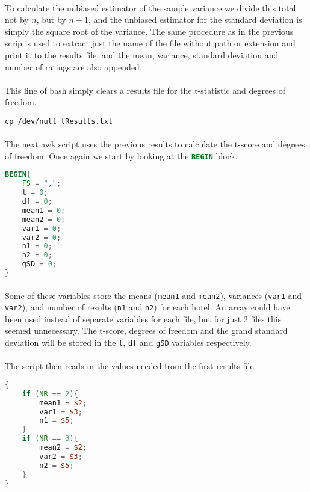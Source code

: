 \documentclass[10pt]{article}
\begin{document}
\paragraph{}
To calculate the unbiased estimator of the sample variance we divide this total not by $n$, but by $n-1$, and the unbiased estimator for the standard deviation is simply the square root of the variance. The same procedure as in the previous scrip is used to extract just the name of the file without path or extension and print it to the results file, and the mean, variance, standard deviation and number of ratings are also appended.
\paragraph{}
This line of bash simply clears a results file for the t-statistic and degrees of freedom.
\begin{lstlisting}
cp /dev/null tResults.txt
\end{lstlisting}
\paragraph{}
The next awk script uses the previous results to calculate the t-score and degrees of freedom. Once again we start by looking at the \lstinline[language=awk]$BEGIN$ block.
\begin{lstlisting}[language=awk]
BEGIN{	
	FS = ",";
	t = 0;
	df = 0;
	mean1 = 0;
	mean2 = 0;
	var1 = 0;
	var2 = 0;
	n1 = 0;
	n2 = 0;
	gSD = 0;
}
\end{lstlisting}
\paragraph{}
Some of these variables store the means (\lstinline$mean1$ and \lstinline$mean2$), variances (\lstinline$var1$ and \lstinline$var2$), and number of results (\lstinline$n1$ and \lstinline$n2$) for each hotel. An array could have been used instead of separate variables for each file, but for just 2 files this seemed unnecessary. The t-score, degrees of freedom and the grand standard deviation will be stored in the \lstinline$t$, \lstinline$df$ and \lstinline$gSD$ variables respectively.
\paragraph{}
The script then reads in the values needed from the first results file.
\begin{lstlisting}[language=awk]
{
	if (NR == 2){
		mean1 = $2;
		var1 = $3;
		n1 = $5;
	}
	if (NR == 3){
		mean2 = $2;
		var2 = $3;
		n2 = $5;
	}
}
\end{lstlisting}
\end{document}
